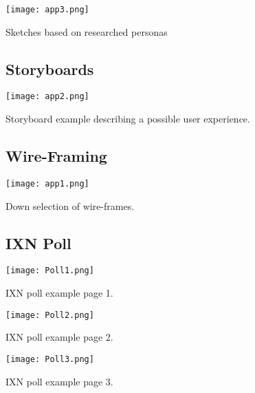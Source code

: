 \documentclass[fontsize=11pt]{extarticle}
\numberwithin{figure}{section} %
\begin{document}
 \newpage

\begin{landscape}
 \begin{table}[H]
      \centering
      \texttt{[image: app3.png]}
      \caption{Sketches based on researched personas}
 \end{table}
  \end{landscape}

\newpage

\begin{landscape}
\subsection{Storyboards}
 \begin{table}[H]
      \centering
      \texttt{[image: app2.png]}
      \caption{Storyboard example describing a possible user experience.}
 \end{table}
\end{landscape}

 \newpage

\begin{landscape}
\subsection{Wire-Framing}
\begin{table}[H]
      \centering
      \texttt{[image: app1.png]}
      \caption{Down selection of wire-frames.}
 \end{table}
 \end{landscape}

 \begin{landscape}
\subsection{IXN Poll}
\begin{table}[H]
      \centering
      \texttt{[image: Poll1.png]}
      \caption{IXN poll example page 1. }
 \end{table}

 \begin{table}[H]
      \centering
      \texttt{[image: Poll2.png]}
      \caption{IXN poll example page 2.}
 \end{table}

 \begin{table}[H]
      \centering
      \texttt{[image: Poll3.png]}
      \caption{IXN poll example page 3.}
 \end{table}

 \end{landscape}
\end{document}
